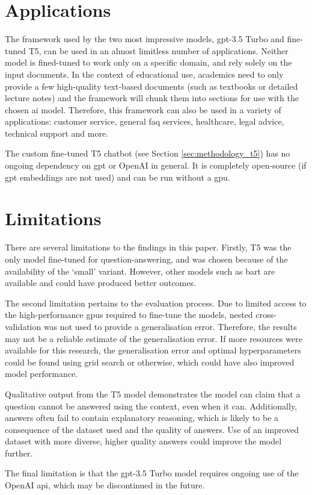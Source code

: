 \section{Applications}
The framework used by the two most impressive models, \acrshort{gpt}-3.5 Turbo and fine-tuned T5, can be used in an almost limitless number of applications. Neither model is fined-tuned to work only on a specific domain, and rely solely on the input documents. In the context of educational use, academics need to only provide a few high-quality text-based documents (such as textbooks or detailed lecture notes) and the framework will chunk them into sections for use with the chosen \acrshort{ai} model. Therefore, this framework can also be used in a variety of applications: customer service, general \acrshort{faq} services, healthcare, legal advice, technical support and more. 

The custom fine-tuned T5 chatbot (see Section \ref{sec:methodology_t5}) has no ongoing dependency on \acrshort{gpt} or OpenAI in general. It is completely open-source (if \acrshort{gpt} embeddings are not used) and can be run without a \acrshort{gpu}.

\section{Limitations}
There are several limitations to the findings in this paper. Firstly, T5 was the only model fine-tuned for question-answering, and was chosen because of the availability of the `small' variant. However, other models such as \acrshort{bart} are available and could have produced better outcomes.

The second limitation pertains to the evaluation process. Due to limited access to the high-performance \acrshort{gpu}s required to fine-tune the models, nested cross-validation was not used to provide a generalisation error. Therefore, the results may not be a reliable estimate of the generalisation error. If more resources were available for this research, the generalisation error and optimal hyperparameters could be found using grid search or otherwise, which could have also improved model performance.

Qualitative output from the T5 model demonstrates the model can claim that a question cannot be answered using the context, even when it can. Additionally, answers often fail to contain explanatory reasoning, which is likely to be a consequence of the dataset used and the quality of answers. Use of an improved dataset with more diverse, higher quality answers could improve the model further. 

The final limitation is that the \acrshort{gpt}-3.5 Turbo model requires ongoing use of the OpenAI \acrshort{api}, which may be discontinued in the future.